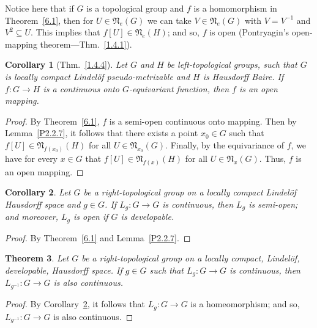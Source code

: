 \documentclass[12pt,final,3p,times]{elsarticle}
\newtheorem{thm}{Theorem}[section]
\newtheorem{cor}[thm]{Corollary}
\theoremstyle{definition}
\numberwithin{equation}{section}
\begin{document}
Notice here that if $G$ is a topological group and $f$ is a homomorphism in Theorem~\ref{6.1}, then for $U\in\mathfrak{N}_e(G)$ we can take $V\in\mathfrak{N}_e(G)$ with $V=V^{-1}$ and $V^2\subseteq U$. This implies that $f[U]\in\mathfrak{N}_e(H)$; and so, $f$ is open (Pontryagin's open-mapping theorem---Thm.~\ref{1.4.1}).

\begin{cor}[Thm.~\ref{1.4.4}]\label{6.2}
Let $G$ and $H$ be left-topological groups, such that $G$ is locally compact Lindel\"{o}f pseudo-metrizable and $H$ is Hausdorff Baire. If $f\colon G\rightarrow H$ is a continuous onto $G$-equivariant function, then $f$ is an open mapping.
\end{cor}

\begin{proof}
    By Theorem~\ref{6.1}, $f$ is a semi-open continuous onto mapping. Then by Lemma~\ref{P2.2.7}, it follows that there exists a point $x_0\in G$ such that $f[U]\in\mathfrak{N}_{f(x_0)}(H)$ for all $U\in\mathfrak{N}_{x_0}(G)$. Finally, by the equivariance of $f$, we have for every $x\in G$ that $f[U]\in\mathfrak{N}_{f(x)}(H)$ for all $U\in\mathfrak{N}_{x}(G)$. Thus, $f$ is an open mapping.
\end{proof}

\begin{cor}\label{6.3}
Let $G$ be a right-topological group on a locally compact Lindel\"{o}f Hausdorff space and $g\in G$. If $L_g\colon G\rightarrow G$ is continuous, then $L_g$ is semi-open; and moreover, $L_g$ is open if $G$ is developable.
\end{cor}

\begin{proof}
    By Theorem~\ref{6.1} and Lemma~\ref{P2.2.7}.
\end{proof}

\begin{thm}\label{6.4}
Let $G$ be a right-topological group on a locally compact, Lindel\"{o}f, developable, Hausdorff space. If $g\in G$ such that
$L_g\colon G\rightarrow G$ is continuous, then $L_{g^{-1}}\colon G\rightarrow G$ is also continuous.
\end{thm}

\begin{proof}
By Corollary~\ref{6.3}, it follows that $L_g\colon G\rightarrow G$ is a homeomorphism; and so, $L_{g^{-1}}\colon G\rightarrow G$ is also continuous.
\end{proof}

\end{document}
